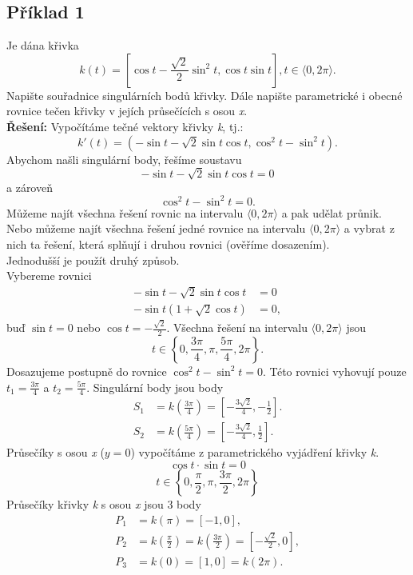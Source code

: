 	\subsection*{Příklad 1}
	Je dána křivka 
	$$k(t) = \left[\cos{t} - \frac{\sqrt{2}}{2}\sin^2{t}, \cos{t}\sin{t}\right], t \in \langle0, 2\pi\rangle.$$
	Napište souřadnice singulárních bodů křivky. Dále napište parametrické i obecné rovnice tečen křivky
	v jejích průsečících s osou \textit{x}. \\[10pt]
	\textbf{Řešení:} Vypočítáme tečné vektory křivky \textit{k}, tj.:
	$$k'(t) = (-\sin{t}-\sqrt{2}\sin{t}\cos{t}, \cos^2{t}-\sin^2{t}).$$
	Abychom našli singulární body, řešíme soustavu
	$$-\sin{t}-\sqrt{2}\sin{t}\cos{t}=0$$
	a zároveň
	$$\cos^2{t}-\sin^2{t}=0.$$
	Můžeme najít všechna řešení rovnic na intervalu $\langle0,2\pi\rangle$ a pak udělat průnik.
	Nebo můžeme najít všechna řešení jedné rovnice na intervalu $\langle0,2\pi\rangle$ a vybrat
	z nich ta řešení, která splňují i druhou rovnici (ověříme dosazením).\\
	Jednodušší je použít druhý způsob. \\
	Vybereme rovnici
	\begin{align*}
		-\sin{t}-\sqrt{2}\sin{t}\cos{t} & = 0  \\
		-\sin{t}(1+\sqrt{2}\cos{t})     & = 0, 
	\end{align*}
	buď $\sin{t} = 0$ nebo $\cos{t}=-\frac{\sqrt{2}}{2}$.
	Všechna řešení na intervalu $\langle0,2\pi\rangle$ jsou
	$$t \in \left\{ 0, \frac{3\pi}{4}, \pi, \frac{5\pi}{4}, 2\pi \right\}.$$
	Dosazujeme postupně do rovnice $\cos^2{t}-\sin^2{t}=0$. Této rovnici vyhovují pouze
	$t_1 = \frac{3\pi}{4}$ a $t_2 = \frac{5\pi}{4}$. Singulární body jsou body
	\begin{align*}
		S_1 & = k\left(\frac{3\pi}{4}\right) = \left[-\frac{3\sqrt{2}}{4},-\frac{1}{2}\right]. \\
		S_2 & = k\left(\frac{5\pi}{4}\right) = \left[-\frac{3\sqrt{2}}{4},\frac{1}{2}\right].  
	\end{align*}
	Průsečíky s osou \textit{x} ($y=0$) vypočítáme z parametrického vyjádření křivky \textit{k}.
	$$\cos{t}\cdot\sin{t} = 0$$
	$$t\in\left\{0, \frac{\pi}{2}, \pi, \frac{3\pi}{2}, 2\pi\right\}$$
	Průsečíky křivky \textit{k} s osou \textit{x} jsou 3 body
	\begin{align*}
		P_1 & = k(\pi) = [-1,0],                                                                                 \\
		P_2 & = k\left(\frac{\pi}{2}\right) = k\left(\frac{3\pi}{2}\right) = \left[-\frac{\sqrt{2}}{2},0\right], \\
		P_3 & = k(0) = [1,0] = k(2\pi).                                                                          
	\end{align*}
